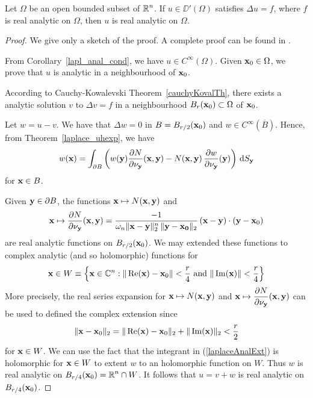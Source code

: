 \begin{cor}
Let $\Omega$ be an open bounded subset of $\displaystyle \mathbb{R}^n$.  If
$u\in \DD'(\Omega)$ satisfies $\Delta u = f$, where $f$ is real
analytic on $\Omega$, then $u$ is real analytic on $\Omega$.
\end{cor}

\begin{proof}
We give only a sketch of the proof.  A complete proof can be found in
\cite{FoPDE,Tr}.

From Corollary~\ref{lapl_anal_cond}, we have
$\displaystyle u \in C^{\infty}(\Omega)$.
Given $\mathbf{x}_0\in \Omega$, we prove that $u$ is analytic in a
neighbourhood of $\mathbf{x}_0$.

According to Cauchy-Kowalevski Theorem~\ref{cauchyKovalTh}, there
exists a analytic solution $v$ to $\Delta v = f$ in a neighbourhood
$B_r(\mathbf{x}_0) \subset \Omega$ of $\mathbf{x}_0$.

Let $w = u-v$.  We have that $\Delta w =0$ in $B = B_{r/2}(\mathbf{x}_0)$
and $\displaystyle w \in C^{\infty}(\overline{B})$.  Hence, from
Theorem~\ref{laplace_uhexp}, we have
\begin{equation} \label{laplaceAnalExt}
w(\mathbf{x}) = \int_{\partial B} \left( w(\mathbf{y})
\frac{\partial{N}}{\partial \mathbf{\nu}_{\mathbf{y}}}(\mathbf{x},\mathbf{y}) -
N(\mathbf{x},\mathbf{y})\,\frac{\partial{w}}{\partial \mathbf{\nu}_{\mathbf{y}}}(\mathbf{y})\right)
\,\mathrm{d}{S}_{\mathbf{y}}
\end{equation}
for $\mathbf{x} \in B$.

Given $\mathbf{y} \in \partial B$, the functions
$\mathbf{x} \mapsto N(\mathbf{x},\mathbf{y})$ and
\[
\mathbf{x} \mapsto \frac{\partial{N}}{\partial \mathbf{\nu}_{\mathbf{y}}}(\mathbf{x},\mathbf{y})
= \frac{-1}{\omega_n \|\mathbf{x}-\mathbf{y}\|_2^n\,\|\mathbf{y}-\mathbf{x_0}\|_2} \, 
(\mathbf{x} - \mathbf{y}) \cdot (\mathbf{y}-\mathbf{x}_0) 
\]
are real analytic functions on $B_{r/2}(\mathbf{x}_0)$.  We may extended these
functions to complex analytic (and so holomorphic) functions for
\[
\mathbf{x} \in W \equiv \left\{ \mathbf{x} \in \mathbb{C}^n :
\|\operatorname{Re}(\mathbf{x}) - \mathbf{x}_0\| < \frac{r}{4}
\ \text{and} \ \|\operatorname{Im}(\mathbf{x})\| < \frac{r}{4} \right\}
\]
More precisely, the real series expansion for 
$\mathbf{x} \mapsto N(\mathbf{x},\mathbf{y})$ and
$\displaystyle \mathbf{x} \mapsto
\frac{\partial{N}}{\partial \mathbf{\nu}_{\mathbf{y}}}(\mathbf{x},\mathbf{y})$ can be used to
defined the complex extension since
\[
\| \mathbf{x} -\mathbf{x}_0 \|_2
= \|\operatorname{Re}(\mathbf{x}) - \mathbf{x}_0\|_2 + \|\operatorname{Im}(\mathbf{x})\|_2 < \frac{r}{2}
\]
for $\mathbf{x} \in W$.
We can use the fact that the integrant in (\ref{laplaceAnalExt}) is
holomorphic for $\mathbf{x} \in W$ to extent $w$ to an holomorphic
function on $W$.  Thus $w$ is real analytic on
$\displaystyle B_{r/4}(\mathbf{x}_0) = \mathbb{R}^n \cap W$.  It
follows that $u = v+w$ is real analytic on $B_{r/4}(\mathbf{x}_0)$.
\end{proof}

